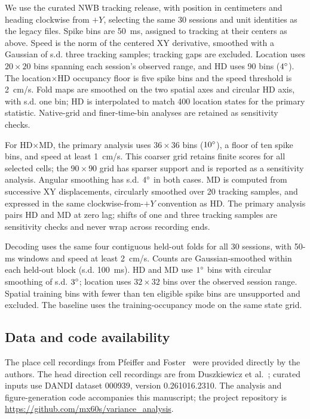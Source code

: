 \documentclass[11pt]{article}
\begin{document}
We use the curated NWB tracking release, with position in centimeters and heading clockwise from $+Y$, selecting the same 30 sessions and unit identities as the legacy files. Spike bins are 50~ms, assigned to tracking at their centers as above. Speed is the norm of the centered XY derivative, smoothed with a Gaussian of s.d. three tracking samples; tracking gaps are excluded. Location uses $20\times20$ bins spanning each session's observed range, and HD uses 90 bins ($4\degree$). The location$\times$HD occupancy floor is five spike bins and the speed threshold is 2~cm/s. Fold maps are smoothed on the two spatial axes and circular HD axis, with s.d. one bin; HD is interpolated to match 400 location states for the primary statistic. Native-grid and finer-time-bin analyses are retained as sensitivity checks.

For HD$\times$MD, the primary analysis uses $36\times36$ bins ($10\degree$), a floor of ten spike bins, and speed at least 1~cm/s. This coarser grid retains finite scores for all selected cells; the $90\times90$ grid has sparser support and is reported as a sensitivity analysis. Angular smoothing has s.d. $4\degree$ in both cases. MD is computed from successive XY displacements, circularly smoothed over 20 tracking samples, and expressed in the same clockwise-from-$+Y$ convention as HD. The primary analysis pairs HD and MD at zero lag; shifts of one and three tracking samples are sensitivity checks and never wrap across recording ends.

Decoding uses the same four contiguous held-out folds for all 30 sessions, with 50-ms windows and speed at least 2~cm/s. Counts are Gaussian-smoothed within each held-out block (s.d. 100~ms). HD and MD use $1\degree$ bins with circular smoothing of s.d. $3\degree$; location uses $32\times32$ bins over the observed session range. Spatial training bins with fewer than ten eligible spike bins are unsupported and excluded. The baseline uses the training-occupancy mode on the same state grid.

\subsection*{Data and code availability}
The place cell recordings from Pfeiffer and Foster~\cite{Pfeiffer2013} were provided directly by the authors. The head direction cell recordings are from Duszkiewicz et al.~\cite{Duszkiewicz2024}; curated inputs use DANDI dataset 000939, version 0.261016.2310. The analysis and figure-generation code accompanies this manuscript; the project repository is \url{https://github.com/mx60s/variance_analysis}.
\end{document}
